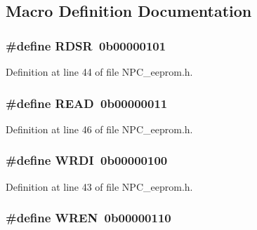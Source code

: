\subsection{Macro Definition Documentation}
\subsubsection[{\texorpdfstring{R\+D\+SR}{RDSR}}]{\setlength{\rightskip}{0pt plus 5cm}\#define R\+D\+SR~0b00000101}\hypertarget{group___instructions_ga899f71cf1ab9be6e8c8482e443558450}{}\label{group___instructions_ga899f71cf1ab9be6e8c8482e443558450}


Definition at line 44 of file N\+P\+C\+\_\+eeprom.\+h.

\subsubsection[{\texorpdfstring{R\+E\+AD}{READ}}]{\setlength{\rightskip}{0pt plus 5cm}\#define R\+E\+AD~0b00000011}\hypertarget{group___instructions_gada74e7db007a68e763f20c17f2985356}{}\label{group___instructions_gada74e7db007a68e763f20c17f2985356}


Definition at line 46 of file N\+P\+C\+\_\+eeprom.\+h.

\subsubsection[{\texorpdfstring{W\+R\+DI}{WRDI}}]{\setlength{\rightskip}{0pt plus 5cm}\#define W\+R\+DI~0b00000100}\hypertarget{group___instructions_gacb229428140f30a6f8b6fa2ebb3fb6f0}{}\label{group___instructions_gacb229428140f30a6f8b6fa2ebb3fb6f0}


Definition at line 43 of file N\+P\+C\+\_\+eeprom.\+h.

\subsubsection[{\texorpdfstring{W\+R\+EN}{WREN}}]{\setlength{\rightskip}{0pt plus 5cm}\#define W\+R\+EN~0b00000110}\hypertarget{group___instructions_ga53dec1d28a7c7b24b2d56c058f7e140a}{}\label{group___instructions_ga53dec1d28a7c7b24b2d56c058f7e140a}


